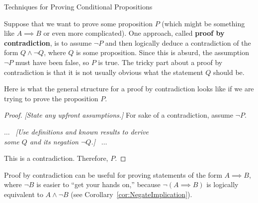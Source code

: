 \begin{section}{Techniques for Proving Conditional Propositions}
%
%
%

Suppose that we want to prove some proposition $P$ (which might be something like $A\implies B$ or even more complicated).  One approach, called \textbf{proof by contradiction}, is to assume $\neg P$ and then logically deduce a contradiction of the form $Q\wedge \neg Q$, where $Q$ is some proposition.  Since this is absurd, the assumption $\neg P$ must have been false, so $P$ is true.  The tricky part about a proof by contradiction is that it is not usually obvious what the statement $Q$ should be.

\begin{skeleton}
Here is what the general structure for a proof by contradiction looks like if we are trying to prove the proposition $P$.

\begin{mdframed}[style=skeleton]
\begin{proof}
\emph{[State any upfront assumptions.]} For sake of a contradiction, assume $\neg P$.
\begin{center}
$\ldots$ \ \emph{[Use definitions and known results to derive\\ some $Q$ and its negation $\neg Q$.]} \ $\ldots$\\
\end{center}
\noindent This is a contradiction. Therefore, $P$.
\end{proof}
\end{mdframed}
\end{skeleton}

Proof by contradiction can be useful for proving statements of the form $A\implies B$, where $\neg B$ is easier to ``get your hands on,'' because $\neg(A \implies B)$ is logically equivalent to $A \wedge \neg B$ (see Corollary~\ref{cor:NegateImplication}).


\end{section}
